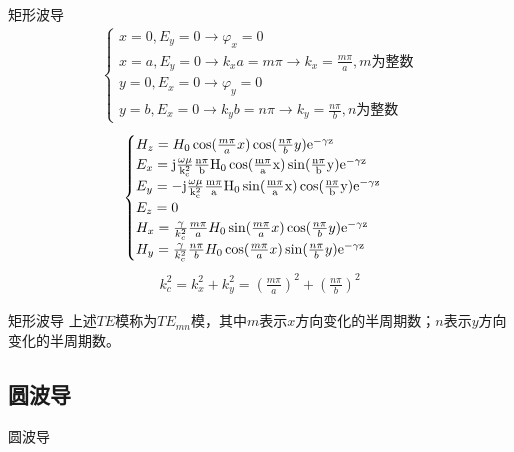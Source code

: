 \begin{frame}{矩形波导}
    \begin{align*}
        \begin{cases}
            x=0,E_y=0 \rightarrow \varphi_x=0                                    \\
            x=a,E_y=0 \rightarrow k_x a=m\pi \rightarrow k_x=\frac{m\pi}{a},m为整数 \\
            y=0,E_x=0 \rightarrow \varphi_y=0                                    \\
            y=b,E_x=0 \rightarrow k_y b=n\pi \rightarrow k_y=\frac{n\pi}{b},n为整数
        \end{cases}
    \end{align*}
    \begin{align}
        \begin{cases}
            H_z=H_0\cos(\frac{m\pi}{a}x)\cos(\frac{n\pi}{b}y)\rm{e}^{-\gamma z}                                             \\
            E_x=\rm{j}\frac{\omega\mu}{k_c^2}\frac{n\pi}{b}H_0\cos(\frac{m\pi}{a}x)\sin(\frac{n\pi}{b}y)\rm{e}^{-\gamma z}  \\
            E_y=-\rm{j}\frac{\omega\mu}{k_c^2}\frac{m\pi}{a}H_0\sin(\frac{m\pi}{a}x)\cos(\frac{n\pi}{b}y)\rm{e}^{-\gamma z} \\
            E_z=0                                                                                                           \\
            H_x=\frac{\gamma}{k_c^2}\frac{m\pi}{a}H_0\sin(\frac{m\pi}{a}x)\cos(\frac{n\pi}{b}y)\rm{e}^{-\gamma z}           \\
            H_y=\frac{\gamma}{k_c^2}\frac{n\pi}{b}H_0\cos(\frac{m\pi}{a}x)\sin(\frac{n\pi}{b}y)\rm{e}^{-\gamma z}
        \end{cases}
    \end{align}
    \begin{align}
        k_c^2=k_x^2+k_y^2=\left(\frac{m\pi}{a}\right)^2+\left(\frac{n\pi}{b}\right)^2
    \end{align}

\end{frame}

\begin{frame}{矩形波导}
    上述$TE$模称为$TE_{mn}$模，其中$m$表示$x$方向变化的半周期数；$n$表示$y$方向变化的半周期数。
\end{frame}

\subsection{圆波导}
\begin{frame}{圆波导}

\end{frame}

